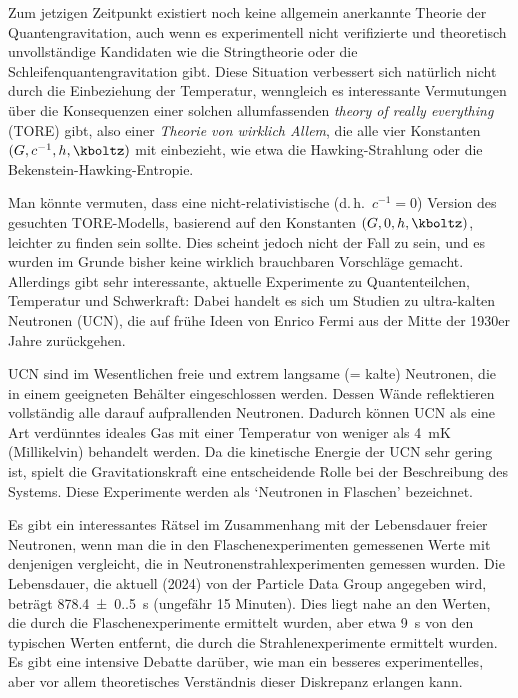 
\newpage {}
\label{sec:1011}

Zum jetzigen Zeitpunkt existiert noch keine allgemein anerkannte Theorie der Quantengravitation, auch wenn es experimentell nicht verifizierte und theoretisch unvollständige Kandidaten wie die Stringtheorie oder die Schleifenquantengravitation gibt. Diese Situation verbessert sich natürlich nicht durch die Einbeziehung der Temperatur, wenngleich es interessante Vermutungen über die Konsequenzen einer solchen allumfassenden \emph{theory of really everything} (TORE) gibt, also einer \emph{Theorie von wirklich Allem}, die alle vier Konstanten $(G, c^{-1}, h, \kboltz)$ mit einbezieht, wie etwa die Hawking-Strahlung oder die Bekenstein-Hawking-Entropie.

Man könnte vermuten, dass eine nicht-relativistische (d.\,h.\ $c^{-1}=0$) Version des gesuchten TORE-Modells, basierend auf den Konstanten $(G,0,h,\kboltz)$, leichter zu finden sein sollte. Dies scheint jedoch nicht der Fall zu sein, und es wurden im Grunde bisher keine wirklich brauchbaren Vorschläge gemacht. Allerdings gibt sehr interessante, aktuelle Experimente zu Quantenteilchen, Temperatur und Schwerkraft: Dabei handelt es sich um Studien zu ultra-kalten Neutronen (UCN), die auf frühe Ideen von Enrico Fermi aus der Mitte der 1930er Jahre zurückgehen.

UCN sind im Wesentlichen freie und extrem langsame (= kalte) Neutronen, die in einem geeigneten Behälter eingeschlossen werden. Dessen Wände reflektieren vollständig alle darauf aufprallenden Neutronen. Dadurch können UCN als eine Art verdünntes ideales Gas mit einer Temperatur von weniger als \qty{4}{\milli\kelvin} (Millikelvin) behandelt werden. Da die kinetische Energie der UCN sehr gering ist, spielt die Gravitationskraft eine entscheidende Rolle bei der Beschreibung des Systems. Diese Experimente werden als \enquote*{Neutronen in Flaschen} bezeichnet.

Es gibt ein interessantes Rätsel im Zusammenhang mit der Lebensdauer freier Neutronen, wenn man die in den Flaschenexperimenten gemessenen Werte mit denjenigen vergleicht, die in Neutronenstrahlexperimenten gemessen wurden. Die Lebensdauer, die aktuell (2024) von der Particle Data Group angegeben wird, beträgt \qty{878.4(0.5)}{\second} (ungefähr 15 Minuten). Dies liegt nahe an den Werten, die durch die Flaschenexperimente ermittelt wurden, aber etwa \qty{9}{\second} von den typischen Werten entfernt, die durch die Strahlenexperimente ermittelt wurden. Es gibt eine intensive Debatte darüber, wie man ein besseres experimentelles, aber vor allem theoretisches Verständnis dieser Diskrepanz erlangen kann.
